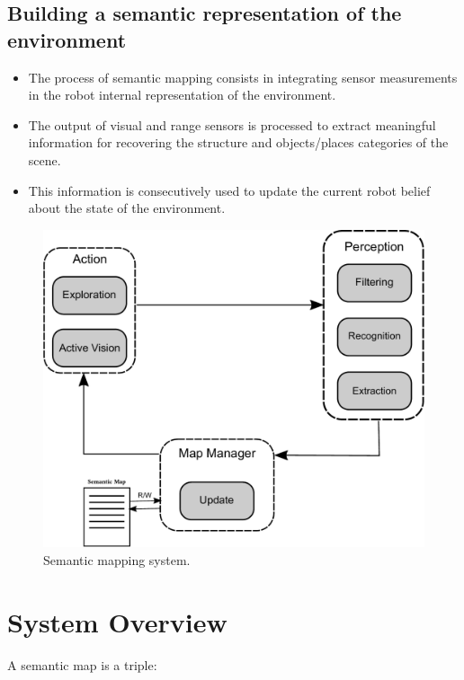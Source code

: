 \documentclass{article}
\begin{document}
	\subsection{Building a semantic representation of the environment}
	
	\begin{itemize}
		\item The process of semantic mapping consists in integrating sensor measurements in the robot internal representation of the environment.
		\item The output of visual and range sensors is processed to extract meaningful information for recovering the structure and objects/places categories of the scene.
		\item This information is consecutively used to update the current robot belief about the state of the environment.
	\end{itemize}
	
	\begin{figure}[h]
		\centering
		\includegraphics[width=\linewidth]{pics/drawing-crop.pdf}
		\caption{Semantic mapping system.}
		\label{fig:pipeline}
	\end{figure}
	
	\newpage
		
	\section{System Overview}
			
	A semantic map is a triple:
	
\end{document}
